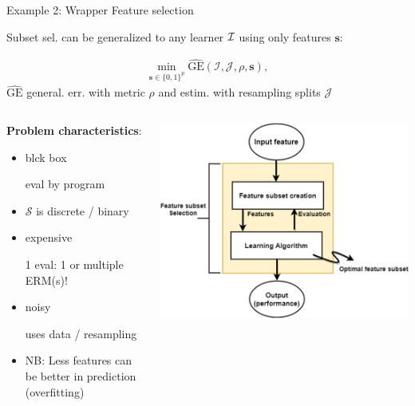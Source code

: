 \documentclass[11pt,compress,t,notes=noshow, xcolor=table]{beamer}
\begin{document}
	
\begin{vbframe}{Example 2: Wrapper Feature selection}

Subset sel. can be generalized to any learner $\mathcal{I}$ using only features $\bm{s}$:

\vspace*{-0.4cm}

\begin{eqnarray*}
	\min_{\textbf{s} \in \{0, 1\}^p} \widehat{\text{GE}}(\mathcal{I}, \mathcal{J}, \rho, \bm{s}),
\end{eqnarray*}
$\widehat{\text{GE}}$ general. err. with metric $\rho$ and estim. with resampling splits $\mathcal{J}$

\vspace*{0.3cm}


\begin{columns}
\begin{column}{0.5\textwidth}
\textbf{Problem characteristics}:
\begin{itemize}
\item blck box \\
\begin{footnotesize}eval by program\end{footnotesize}
\item $\mathcal{S}$ is discrete / binary
\item expensive \\
\begin{footnotesize}
1 eval: 1 or multiple ERM(s)!
\end{footnotesize}
\item noisy \\
\begin{footnotesize}
uses data / resampling
\end{footnotesize}
\item NB: Less features can be better in prediction (overfitting)
\end{itemize}
\end{column}
\begin{column}{0.5\textwidth}
\begin{center}
\includegraphics[width=1\textwidth]{figure_man/feature_subset_selection.png}

\end{center}
\end{column}
\end{columns}
\end{vbframe}
\end{document}
